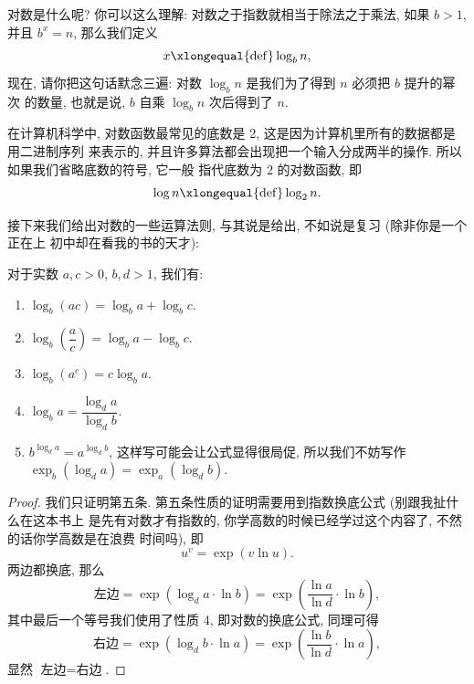 \documentclass[10pt,UTF8]{book} %
\begin{document}
对数是什么呢? 你可以这么理解: 对数之于指数就相当于除法之于乘法, 如果 $b>1$, 并且
$b^x = n$, 那么我们定义
\[ x \xlongequal{\mathrm{def}} \log_b n, \]
现在, 请你把这句话默念三遍: 对数 $\log_b n$ 是我们为了得到 $n$ 必须把 $b$ 提升的幂次
的数量, 也就是说, $b$ 自乘 $\log_b n$ 次后得到了 $n$.

在计算机科学中, 对数函数最常见的底数是 2, 这是因为计算机里所有的数据都是用二进制序列
来表示的, 并且许多算法都会出现把一个输入分成两半的操作. 所以如果我们省略底数的符号, 它一般
指代底数为 2 的对数函数, 即
\[ \log n \xlongequal{\mathrm{def}} \log_2 n. \]

接下来我们给出对数的一些运算法则, 与其说是给出, 不如说是复习 (除非你是一个正在上
初中却在看我的书的天才):

\begin{thm}
    对于实数 $a,c > 0$, $b,d > 1$, 我们有:
    \begin{enumerate}[label=\textup{\arabic*}${}^\circ$]
        \item $\log_b (ac)= \log_b a + \log_b c$.
        \item $\log_b \left(\dfrac{a}{c}\right)
        = \log_b a - \log_b c$.
        \item $\log_b (a^c) = c \log_b a$.
        \item $\log_b a = \dfrac{\log_d a}{\log_d b}$.
        \item $b^{\log_d a} = a^{\log_d b}$, 这样写可能会让公式显得很局促,
        所以我们不妨写作 $\exp_b \left( \log_d a \right) 
        = \exp_a \left( \log_d b\right)$.
    \end{enumerate}
    \begin{proof}
        我们只证明第五条. 第五条性质的证明需要用到指数换底公式 (别跟我扯什么在这本书上
        是先有对数才有指数的, 你学高数的时候已经学过这个内容了, 不然的话你学高数是在浪费
        时间吗), 即
        \[ u^v = \exp \left( v \ln u \right). \]
        两边都换底, 那么
        \[ \text{左边} = \exp \left( \log_d a \cdot \ln b \right)
        = \exp \left( \dfrac{\ln a}{\ln d} \cdot \ln b \right), \]
        其中最后一个等号我们使用了性质 4, 即对数的换底公式, 同理可得
        \[ \text{右边} = \exp \left( \log_d b \cdot \ln a \right)
        = \exp \left( \dfrac{\ln b}{\ln d} \cdot \ln a \right), \]
        显然 $\text{左边} = \text{右边}$.
    \end{proof}
\end{thm}
\end{document}
